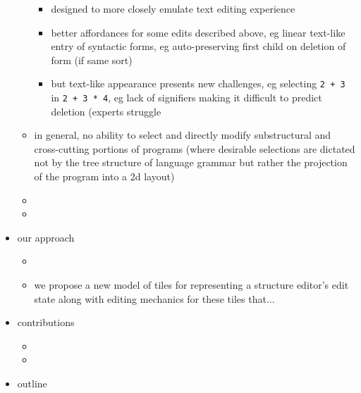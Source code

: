 \begin{itemize}
\begin{itemize}
  \begin{itemize}
    \item designed to more closely emulate text editing experience
    \item better affordances for some edits described above,
      eg linear text-like entry of syntactic forms,
      eg auto-preserving first child on deletion of form (if same sort)
    \item but text-like appearance presents new challenges,
      eg selecting \texttt{2 + 3} in \texttt{2 + 3 * 4},
      eg lack of signifiers making it difficult to predict deletion (experts struggle
  \end{itemize}
  \item in general, no ability to select and directly modify substructural
    and cross-cutting portions of programs (where desirable selections are
    dictated not by the tree structure of language grammar but rather the
    projection of the program into a 2d layout)
  \item {}
  \item {}
\end{itemize}
\item our approach
\begin{itemize}
    \item {}
    \item we propose a new model of tiles for representing a structure editor's edit state along with editing mechanics for these tiles that...
\end{itemize}
\item contributions
\begin{itemize}
  \item {}
  \item {}
\end{itemize}
\item outline
\end{itemize}


